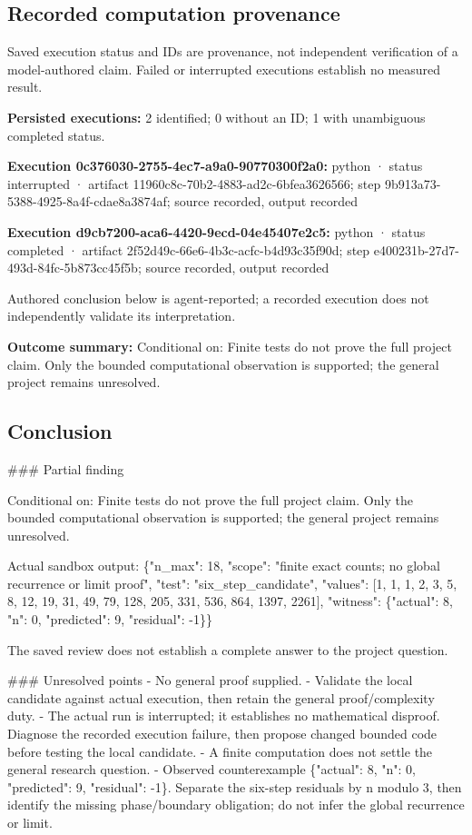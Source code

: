\documentclass[11pt]{article}
\begin{document}
\subsection{Recorded computation provenance}
Saved execution status and IDs are provenance, not independent verification of a model-authored claim. Failed or interrupted executions establish no measured result.\par
\textbf{Persisted executions:} 2 identified; 0 without an ID; 1 with unambiguous completed status.\par
\textbf{Execution 0c376030-2755-4ec7-a9a0-90770300f2a0:} python · status interrupted · artifact 11960c8c-70b2-4883-ad2c-6bfea3626566; step 9b913a73-5388-4925-8a4f-cdae8a3874af; source recorded, output recorded\par
\textbf{Execution d9cb7200-aca6-4420-9ecd-04e45407e2c5:} python · status completed · artifact 2f52d49c-66e6-4b3c-acfc-b4d93c35f90d; step e400231b-27d7-493d-84fc-5b873cc45f5b; source recorded, output recorded\par
Authored conclusion below is agent-reported; a recorded execution does not independently validate its interpretation.\par
\textbf{Outcome summary:} Conditional on: Finite tests do not prove the full project claim. Only the bounded computational observation is supported; the general project remains unresolved.\par
\subsection{Conclusion}
\#\#\# Partial finding

Conditional on: Finite tests do not prove the full project claim. Only the bounded computational observation is supported; the general project remains unresolved.

Actual sandbox output: \{"n\_max": 18, "scope": "finite exact counts; no global recurrence or limit proof", "test": "six\_step\_candidate", "values": [1, 1, 1, 2, 3, 5, 8, 12, 19, 31, 49, 79, 128, 205, 331, 536, 864, 1397, 2261], "witness": \{"actual": 8, "n": 0, "predicted": 9, "residual": -1\}\}

The saved review does not establish a complete answer to the project question.

\#\#\# Unresolved points
- No general proof supplied.
- Validate the local candidate against actual execution, then retain the general proof/complexity duty.
- The actual run is interrupted; it establishes no mathematical disproof. Diagnose the recorded execution failure, then propose changed bounded code before testing the local candidate.
- A finite computation does not settle the general research question.
- Observed counterexample \{"actual": 8, "n": 0, "predicted": 9, "residual": -1\}. Separate the six-step residuals by n modulo 3, then identify the missing phase/boundary obligation; do not infer the global recurrence or limit.
\end{document}
